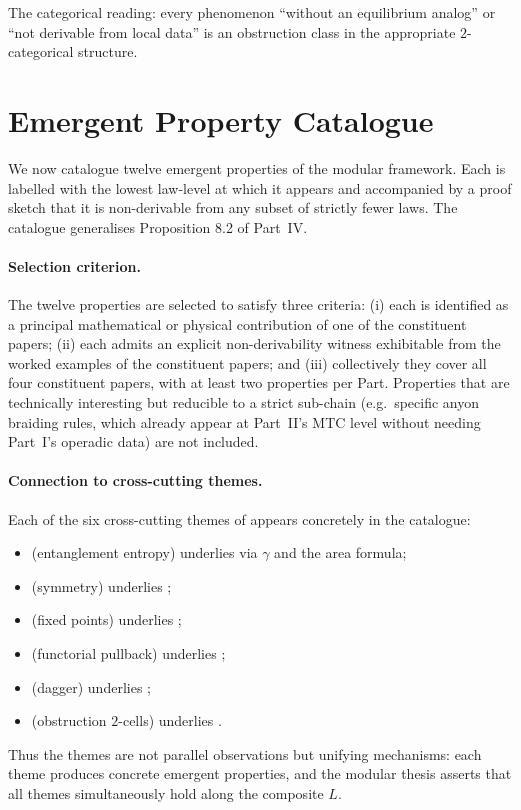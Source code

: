 \documentclass[12pt]{article}
\theoremstyle{definition}
\theoremstyle{remark}
\begin{document}
The categorical reading: every phenomenon ``without an equilibrium analog'' or
``not derivable from local data'' is an obstruction class in the appropriate
$2$-categorical structure.

\section{Emergent Property Catalogue}
\label{sec:catalogue}

We now catalogue twelve emergent properties of the modular framework. Each
is labelled with the lowest law-level at which it appears and accompanied
by a proof sketch that it is non-derivable from any subset of strictly
fewer laws. The catalogue generalises Proposition 8.2 of Part~IV.

\paragraph{Selection criterion.}
The twelve properties are selected to satisfy three criteria: (i) each is
identified as a principal mathematical or physical contribution of one of
the constituent papers; (ii) each admits an explicit non-derivability
witness exhibitable from the worked examples of the constituent papers;
and (iii) collectively they cover all four constituent papers, with at
least two properties per Part. Properties that are technically interesting
but reducible to a strict sub-chain (e.g.\ specific anyon braiding rules,
which already appear at Part~II's MTC level without needing Part~I's
operadic data) are not included.

\paragraph{Connection to cross-cutting themes.}
Each of the six cross-cutting themes of  appears
concretely in the catalogue:
\begin{itemize}[leftmargin=2em]
\item {} (entanglement entropy) underlies
   via $\gamma$ and the area formula;
\item {} (symmetry) underlies ;
\item {} (fixed points) underlies ;
\item {} (functorial pullback) underlies
  ;
\item {} (dagger) underlies ;
\item {} (obstruction $2$-cells) underlies
  .
\end{itemize}
Thus the themes are not parallel observations but unifying mechanisms: each
theme produces concrete emergent properties, and the modular thesis
asserts that all themes simultaneously hold along the composite $L$.
\end{document}
